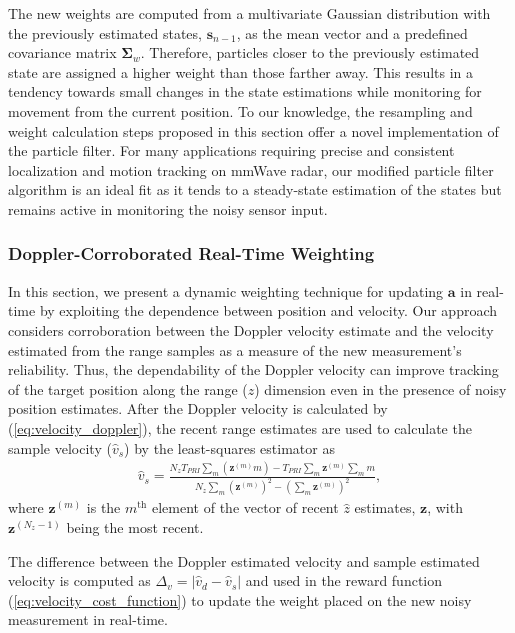 \documentclass[10pt,journal,final]{IEEEtran}
\begin{document}
The new weights are computed from a multivariate Gaussian distribution with the previously estimated states, $\mathbf{s}_{n-1}$, as the mean vector and a predefined covariance matrix $\mathbf{\Sigma}_w$.
Therefore, particles closer to the previously estimated state are assigned a higher weight than those farther away. 
This results in a tendency towards small changes in the state estimations while monitoring for movement from the current position. 
To our knowledge, the resampling and weight calculation steps proposed in this section offer a novel implementation of the particle filter. 
For many applications requiring precise and consistent localization and motion tracking on mmWave radar, our modified particle filter algorithm is an ideal fit as it tends to a steady-state estimation of the states but remains active in monitoring the noisy sensor input.

\subsubsection{Doppler-Corroborated Real-Time Weighting}
In this section, we present a dynamic weighting technique for updating $\mathbf{a}$ in real-time by exploiting the dependence between position and velocity.
Our approach considers corroboration between the Doppler velocity estimate and the velocity estimated from the range samples as a measure of the new measurement's reliability. 
Thus, the dependability of the Doppler velocity can improve tracking of the target position along the range ($z$) dimension even in the presence of noisy position estimates. 
After the Doppler velocity is calculated by (\ref{eq:velocity_doppler}), the recent range estimates are used to calculate the sample velocity ($\hat{v}_s$) by the least-squares estimator as
\begin{gather}
	\hat{v}_s = \frac{N_z T_{PRI} \sum_m (\mathbf{z}^{(m)} m) - T_{PRI} \sum_m \mathbf{z}^{(m)} \sum_m m}{N_z \sum_m (\mathbf{z}^{(m)})^2 - \left( \sum_m \mathbf{z}^{(m)} \right)^2},
\end{gather}
where $\mathbf{z}^{(m)}$ is the $m^{\text{th}}$ element of the vector of recent $\hat{z}$ estimates, $\mathbf{z}$, with $\mathbf{z}^{(N_z-1)}$ being the most recent. 

The difference between the Doppler estimated velocity and sample estimated velocity is computed as $\Delta_v = |\hat{v}_d - \hat{v}_s|$ and used in the reward function (\ref{eq:velocity_cost_function}) to update the weight placed on the new noisy measurement in real-time. 
\end{document}
